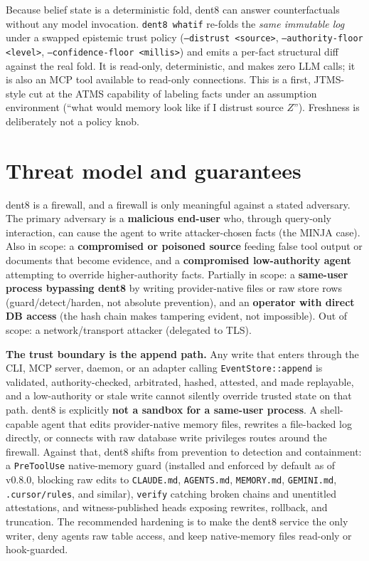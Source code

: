 \documentclass[11pt]{article}
\newcommand{\code}[1]{\texttt{#1}}
\begin{document}
Because belief state is a deterministic fold, dent8 can answer counterfactuals without any model invocation. \code{dent8 whatif} re-folds the \emph{same immutable log} under a swapped epistemic trust policy (\code{--distrust <source>}, \code{--authority-floor <level>}, \code{--confidence-floor <millis>}) and emits a per-fact structural diff against the real fold. It is read-only, deterministic, and makes zero LLM calls; it is also an MCP tool available to read-only connections. This is a first, JTMS-style cut at the ATMS capability of labeling facts under an assumption environment (``what would memory look like if I distrust source $Z$''). Freshness is deliberately not a policy knob.

\section{Threat model and guarantees}

dent8 is a firewall, and a firewall is only meaningful against a stated adversary. The primary adversary is a \textbf{malicious end-user} who, through query-only interaction, can cause the agent to write attacker-chosen facts (the MINJA case). Also in scope: a \textbf{compromised or poisoned source} feeding false tool output or documents that become evidence, and a \textbf{compromised low-authority agent} attempting to override higher-authority facts. Partially in scope: a \textbf{same-user process bypassing dent8} by writing provider-native files or raw store rows (guard/detect/harden, not absolute prevention), and an \textbf{operator with direct DB access} (the hash chain makes tampering evident, not impossible). Out of scope: a network/transport attacker (delegated to TLS).

\textbf{The trust boundary is the append path.} Any write that enters through the CLI, MCP server, daemon, or an adapter calling \code{EventStore::append} is validated, authority-checked, arbitrated, hashed, attested, and made replayable, and a low-authority or stale write cannot silently override trusted state on that path. dent8 is explicitly \textbf{not a sandbox for a same-user process}. A shell-capable agent that edits provider-native memory files, rewrites a file-backed log directly, or connects with raw database write privileges routes around the firewall. Against that, dent8 shifts from prevention to detection and containment: a \code{PreToolUse} native-memory guard (installed and enforced by default as of v0.8.0, blocking raw edits to \code{CLAUDE.md}, \code{AGENTS.md}, \code{MEMORY.md}, \code{GEMINI.md}, \code{.cursor/rules}, and similar), \code{verify} catching broken chains and unentitled attestations, and witness-published heads exposing rewrites, rollback, and truncation. The recommended hardening is to make the dent8 service the only writer, deny agents raw table access, and keep native-memory files read-only or hook-guarded.
\end{document}
